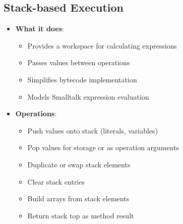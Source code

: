 \documentclass[12pt,a4paper]{report}
\begin{document}
\subsection{Stack-based Execution}
\begin{itemize}
    \item \textbf{What it does}:
    \begin{itemize}
        \item Provides a workspace for calculating expressions
        \item Passes values between operations
        \item Simplifies bytecode implementation
        \item Models Smalltalk expression evaluation
    \end{itemize}
    
    \item \textbf{Operations}:
    \begin{itemize}
        \item Push values onto stack (literals, variables)
        \item Pop values for storage or as operation arguments
        \item Duplicate or swap stack elements
        \item Clear stack entries
        \item Build arrays from stack elements
        \item Return stack top as method result
    \end{itemize}
\end{itemize}
\end{document}

